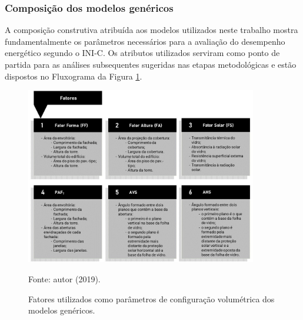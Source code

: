 \subsubsection{Composição dos modelos genéricos}
A composição construtiva atribuída aos modelos utilizados neste trabalho mostra fundamentalmente 
os parâmetros necessários para a avaliação do desempenho energético segundo o INI-C. Os 
atributos utilizados serviram como ponto de partida para as análises subsequentes sugeridas nas 
etapas metodológicas e estão dispostos no Fluxograma da Figura \ref{fig:figura10}.
    \begin{figure}[ht]
        \centering
        \caption{\small Fatores utilizados como parâmetros de configuração volumétrica dos modelos genéricos.}
        \includegraphics[width=0.9\textwidth]{figures/fig10_Fluxogramas-2.jpg}
        \begin{flushleft}
            \par \small Fonte: autor (2019).
        \end{flushleft}
        \label{fig:figura10}
    \end{figure}

